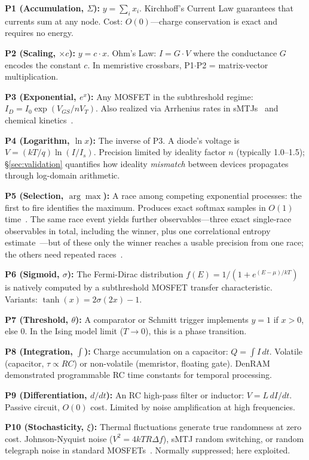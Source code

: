 \documentclass[11pt]{article}
\begin{document}
\textbf{P1 (Accumulation, $\Sigma$):} $y = \sum_i x_i$. Kirchhoff's Current Law guarantees that currents sum at any node. Cost: $O(0)$---charge conservation is exact and requires no energy.

\textbf{P2 (Scaling, $\times c$):} $y = c \cdot x$. Ohm's Law: $I = G \cdot V$ where the conductance $G$ encodes the constant $c$. In memristive crossbars, P1$\cdot$P2 = matrix-vector multiplication.

\textbf{P3 (Exponential, $e^x$):} Any MOSFET in the subthreshold regime: $I_D = I_0 \exp(V_{GS}/nV_T)$. Also realized via Arrhenius rates in sMTJs~\cite{bieg2026sba} and chemical kinetics~\cite{bieg2026}.

\textbf{P4 (Logarithm, $\ln x$):} The inverse of P3. A diode's voltage is $V = (kT/q)\ln(I/I_s)$. Precision limited by ideality factor $n$ (typically 1.0--1.5); \S\ref{sec:validation} quantifies how ideality \textit{mismatch} between devices propagates through log-domain arithmetic.

\textbf{P5 (Selection, $\arg\max$):} A race among competing exponential processes: the first to fire identifies the maximum. Produces exact softmax samples in $O(1)$ time~\cite{bieg2026sba}. The same race event yields further observables---three exact single-race observables in total, including the winner, plus one correlational entropy estimate~\cite{bieg2026}---but of these only the winner reaches a usable precision from one race; the others need repeated races~\cite{bieg2026}.

\textbf{P6 (Sigmoid, $\sigma$):} The Fermi-Dirac distribution $f(E) = 1/(1 + e^{(E-\mu)/kT})$ is natively computed by a subthreshold MOSFET transfer characteristic. Variants: $\tanh(x) = 2\sigma(2x) - 1$.

\textbf{P7 (Threshold, $\theta$):} A comparator or Schmitt trigger implements $y = 1$ if $x > 0$, else $0$. In the Ising model limit ($T \to 0$), this is a phase transition.

\textbf{P8 (Integration, $\int$):} Charge accumulation on a capacitor: $Q = \int I\,dt$. Volatile (capacitor, $\tau \propto RC$) or non-volatile (memristor, floating gate). DenRAM~\cite{denram2024} demonstrated programmable RC time constants for temporal processing.

\textbf{P9 (Differentiation, $d/dt$):} An RC high-pass filter or inductor: $V = L\,dI/dt$. Passive circuit, $O(0)$ cost. Limited by noise amplification at high frequencies.

\textbf{P10 (Stochasticity, $\xi$):} Thermal fluctuations generate true randomness at zero cost. Johnson-Nyquist noise ($V^2 = 4kTR\Delta f$), sMTJ random switching, or random telegraph noise in standard MOSFETs~\cite{cryptoristor2024}. Normally suppressed; here exploited.
\end{document}

